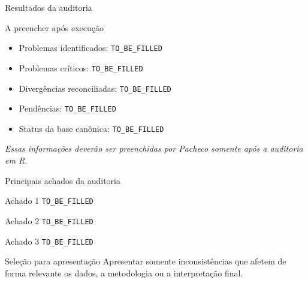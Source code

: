 
\begin{frame}{Resultados da auditoria}

    \begin{block}{A preencher após execução}

        \begin{itemize}

            \item Problemas identificados:
                  \texttt{TO\_BE\_FILLED}

            \item Problemas críticos:
                  \texttt{TO\_BE\_FILLED}

            \item Divergências reconciliadas:
                  \texttt{TO\_BE\_FILLED}

            \item Pendências:
                  \texttt{TO\_BE\_FILLED}

            \item Status da base canônica:
                  \texttt{TO\_BE\_FILLED}

        \end{itemize}

    \end{block}

    \vspace{0.3cm}

    \centering
    \textit{Essas informações deverão ser preenchidas por Pacheco
    somente após a auditoria em R.}

\end{frame}



\begin{frame}{Principais achados da auditoria}

    \begin{block}{Achado 1}
        \texttt{TO\_BE\_FILLED}
    \end{block}

    \begin{block}{Achado 2}
        \texttt{TO\_BE\_FILLED}
    \end{block}

    \begin{block}{Achado 3}
        \texttt{TO\_BE\_FILLED}
    \end{block}

    \vspace{0.2cm}

    \begin{alertblock}{Seleção para apresentação}
        Apresentar somente inconsistências que afetem de forma relevante
        os dados, a metodologia ou a interpretação final.
    \end{alertblock}

\end{frame}


